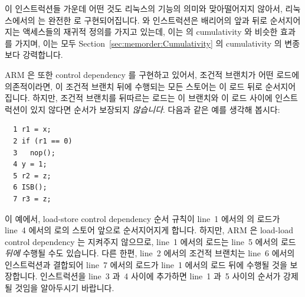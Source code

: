 이 인스트럭션들 가운데 어떤 것도 리눅스의  기능의 의미와 맞아떨어지지
않아서, 리눅스에서의  는 완전한  로 구현되어집니다.
 와  인스트럭션은 배리어의 앞과 뒤로 순서지어지는 액세스들의
재귀적 정의를 가지고 있는데, 이는 \Power{} 의 cumulativity 와 비슷한 효과를
가지며, 이는 모두 Section~\ref{sec:memorder:Cumulativity} 의 cumulativity 의
변종보다 강력합니다.

ARM 은 또한 control dependency 를 구현하고 있어서, 조건적 브랜치가 어떤 로드에
의존적이라면, 이 조건적 브랜치 뒤에 수행되는 모든 스토어는 이 로드 뒤로
순서지어집니다.
하지만, 조건적 브랜치를 뒤따르는 로드는 이 브랜치와 이 로드 사이에 
인스트럭션이 있지 않다면 순서가 보장되지 \emph{않습니다}.
다음과 같은 예를 생각해 봅시다:

\vspace{5pt}
\begin{minipage}[t]{\columnwidth}
\small
\begin{verbatim}
  1 r1 = x;
  2 if (r1 == 0)
  3   nop();
  4 y = 1;
  5 r2 = z;
  6 ISB();
  7 r3 = z;
\end{verbatim}
\end{minipage}
\vspace{5pt}

이 예에서, load-store control dependency 순서 규칙이 line~1 에서의  의
로드가 line~4 에서의  로의 스토어 앞으로 순서지어지게 합니다.
하지만, ARM 은 load-load control dependency 는 지켜주지 않으므로, line~1 에서의
로드는 line~5 에서의 로드 \emph{뒤에} 수행될 수도 있습니다.
다른 한편, line~2 에서의 조건적 브랜치는 line~6 에서의  인스트럭션과
결합되어 line~7 에서의 로드가 line~1 에서의 로드 뒤에 수행될 것을 보장합니다.
 인스트럭션을 line~3 과~4 사이에 추가하면 line~1 과~5 사이의 순서가
강제될 것임을 알아두시기 바랍니다.
\iffalse

